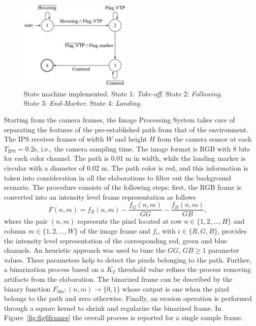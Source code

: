 \documentclass[a4paper,twocolumn,10pt]{article}
\begin{document}
    \begin{figure}
        \centering
        \includegraphics[width=0.49\textwidth]{pics/fig5_lines.png}
        \caption{State machine implemented. State 1: \textit{Take-off}. State 2: \textit{Following}. State 3: \textit{End-Marker}. State 4: \textit{Landing}.} 
        \label{fig:fig5stateMachine}
    \end{figure} 

    Starting from the camera frames, the Image Processing System takes care of separating the features of the 
    pre-established path from that of the environment.
    The IPS receives frames of width $W$ and height $H$ from the camera sensor at each   
    $T_\mathrm{IPS} = 0.2$s, i.e., the camera sampling time. The image format is RGB with 
    $8$ bits for each color channel. The path is 0.01 m in width, while the landing marker 
    is circular with a diameter of 0.02 m. The path color is red, and this information is 
    taken into consideration in all the elaborations to filter out the background scenario. The 
    procedure consists of the following steps: first, the RGB frame is converted into an intensity 
    level frame representation as follows 
    \begin{equation}
        F(n,m)=f_R(n,m) -  \frac{f_G(n,m)}{GG} - \frac{f_B(n,m)}{GB} ,
    \end{equation}
    where the pair $(n,m)$ represents the pixel located at row $n \in \{1, 2, \dots, H\}$ and column $m 
    \in \{1, 2, \dots, W\}$ of the image frame and $f_i$, with $i \in \{R, G, B\}$, provides the intensity level representation of the corresponding red, green and blue channels. An heuristic 
    approach was used to tune the $GG$, $GB \geq 1$ parameter values. These parameters help to detect the pixels belonging to the path. Further, a binarization process based on a $K_T$  threshold value refines the process removing artifacts from the elaboration. The binarized frame can be described by the binary 
    function $F_\mathrm{bin} \colon (n,m) \to \{0, 1\}$ whose output is one when the pixel belongs to the path and zero otherwise. Finally, an erosion operation is performed through a 
    square kernel to shrink and regularize the binarized frame. In Figure~\ref{fig:fig6frames} the overall process is reported for a single sample frame.
\end{document}
